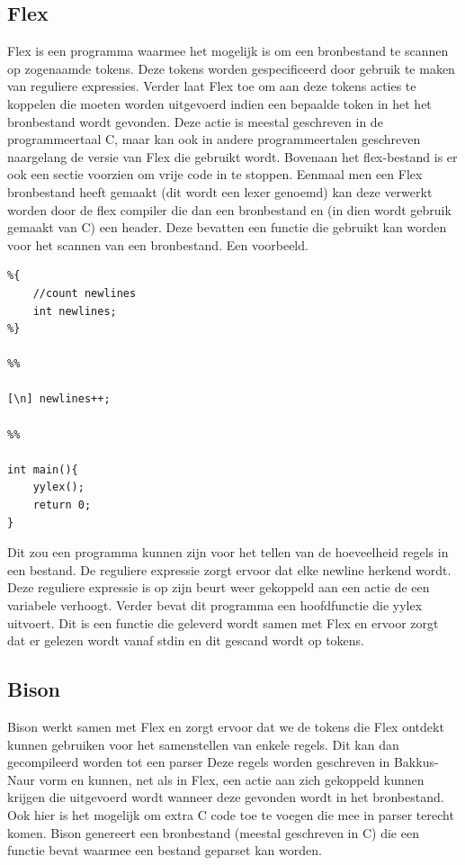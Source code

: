 \documentclass[11pt,a4paper]{article}
\begin{document}
\subsection{Flex}
Flex is een programma waarmee het mogelijk is om een bronbestand te scannen op zogenaamde tokens. Deze tokens worden gespecificeerd door gebruik te maken van reguliere expressies. Verder laat Flex toe om aan deze tokens acties te koppelen die moeten worden uitgevoerd indien een bepaalde token in het het bronbestand wordt gevonden. Deze actie is meestal geschreven in de programmeertaal C, maar kan ook in andere programmeertalen geschreven naargelang de versie van Flex die gebruikt wordt. Bovenaan het flex-bestand is er ook een sectie voorzien om vrije code in te stoppen. Eenmaal men een Flex bronbestand heeft gemaakt (dit wordt een lexer genoemd) kan deze verwerkt worden door de flex compiler die dan een bronbestand en (in dien wordt gebruik gemaakt van C) een header. Deze bevatten een functie die gebruikt kan worden voor het scannen van een bronbestand. Een voorbeeld.
\begin{verbatim}
%{
	//count newlines
	int newlines;
%}

%%

[\n] newlines++;

%%

int main(){
	yylex();
	return 0;
}
\end{verbatim}  
Dit zou een programma kunnen  zijn voor het tellen van de hoeveelheid regels in een bestand. De reguliere expressie zorgt ervoor dat elke newline herkend wordt. Deze reguliere expressie is op zijn beurt weer gekoppeld aan een actie de een variabele verhoogt. Verder bevat dit programma een hoofdfunctie die yylex uitvoert. Dit is een functie die geleverd wordt samen met Flex en ervoor zorgt dat er gelezen wordt vanaf stdin en dit gescand wordt op tokens.

\subsection{Bison}
Bison werkt samen met Flex en zorgt ervoor dat we de tokens die Flex ontdekt kunnen gebruiken voor het samenstellen van enkele regels. Dit kan dan gecompileerd worden tot een parser Deze regels worden geschreven in Bakkus-Naur vorm en kunnen, net als in Flex, een actie aan zich gekoppeld kunnen krijgen die uitgevoerd wordt wanneer deze gevonden wordt in het bronbestand. Ook hier is het mogelijk om extra C code toe te voegen die mee in parser terecht komen. Bison genereert een bronbestand (meestal geschreven in C) die een functie bevat waarmee een bestand geparset kan worden.
\end{document}
